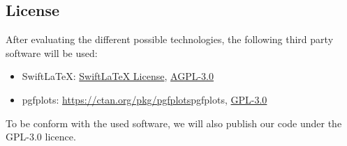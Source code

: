 \subsection{License}
After evaluating the different possible technologies, the following third party software will be used:
\begin{itemize}
    \item SwiftLaTeX: \href{https://github.com/SwiftLaTeX/SwiftLaTeX/blob/master/LICENSE}{SwiftLaTeX License}, \href{https://www.gnu.org/licenses/agpl-3.0.en.html}{AGPL-3.0}
    \item pgfplots: \href{https://ctan.org/pkg/pgfplots}{https://ctan.org/pkg/pgfplots}{pgfplots}, \href{https://www.gnu.org/licenses/gpl-3.0.en.html}{GPL-3.0}
\end{itemize}
To be conform with the used software, we will also publish our code under the GPL-3.0 licence.
